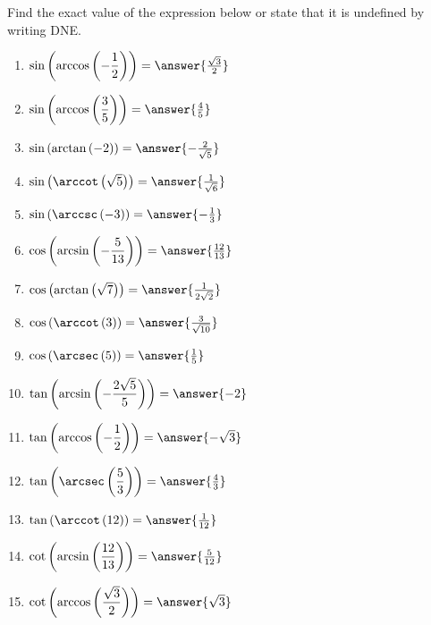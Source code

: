 \documentclass{ximera}
\author{Carl Stitz \and Jeff Zeager \and Bart Snapp \and Matthew Carr}
\begin{document}
\begin{exercise}





Find the exact value of the expression below or state that it is undefined by writing DNE.
\begin{enumerate}
\item  $\sin\left(\arccos\left(-\dfrac{1}{2}\right)\right)=\answer{\frac{\sqrt{3}}{2}}$ \label{stillmoreexactfirst}
\item  $\sin\left(\arccos\left(\dfrac{3}{5}\right)\right)=\answer{\frac{4}{5}}$
\item  $\sin\left(\arctan\left(-2\right)\right)=\answer{-\frac{2}{\sqrt{5}}}$ 
\item  $\sin\left(\arccot\left(\sqrt{5}\right)\right)=\answer{\frac{1}{\sqrt{6}}}$ 
\item  $\sin\left(\arccsc\left(-3\right)\right)=\answer{-\frac{1}{3}}$ 
\item  $\cos\left(\arcsin\left(-\dfrac{5}{13}\right)\right)=\answer{\frac{12}{13}}$
\item  $\cos\left(\arctan\left(\sqrt{7} \right)\right)=\answer{\frac{1}{2\sqrt{2}}}$
\item  $\cos\left(\arccot\left( 3 \right)\right)=\answer{\frac{3}{\sqrt{10}}}$
\item  $\cos\left(\arcsec\left( 5 \right)\right)=\answer{\frac{1}{5}}$
\item  $\tan\left(\arcsin\left(-\dfrac{2\sqrt{5}}{5}\right)\right)=\answer{-2}$
\item  $\tan\left(\arccos\left(-\dfrac{1}{2}\right)\right)=\answer{-\sqrt{3}}$ 
\item  $\tan\left(\arcsec\left(\dfrac{5}{3}\right)\right)=\answer{\frac{4}{3}}$ 
\item  $\tan\left(\arccot\left( 12  \right)\right)=\answer{\frac{1}{12}}$ 
\item  $\cot\left(\arcsin\left(\dfrac{12}{13}\right)\right)=\answer{\frac{5}{12}}$ 
\item  $\cot\left(\arccos\left(\dfrac{\sqrt{3}}{2}\right)\right)=\answer{\sqrt{3}}$

\end{enumerate}
\end{exercise}
\end{document}
